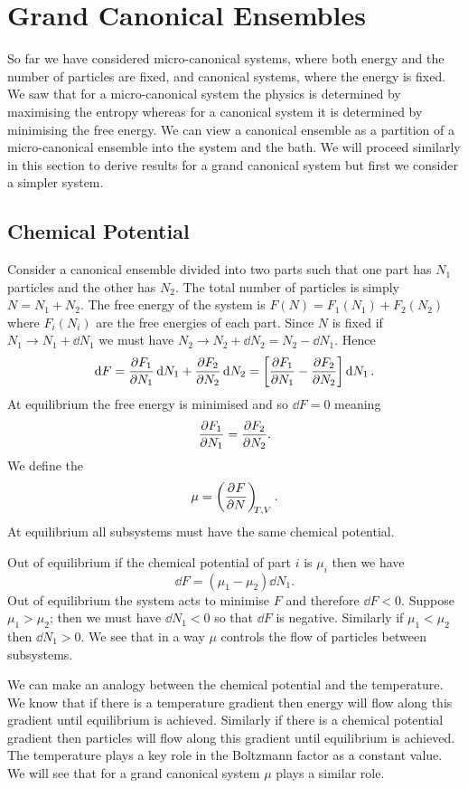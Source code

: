 \documentclass[a4paper]{article}
\begin{document}
    \section{Grand Canonical Ensembles}
    So far we have considered micro-canonical systems, where both energy and the number of particles are fixed, and canonical systems, where the energy is fixed.
    We saw that for a micro-canonical system the physics is determined by maximising the entropy whereas for a canonical system it is determined by minimising the free energy.
    We can view a canonical ensemble as a partition of a micro-canonical ensemble into the system and the bath.
    We will proceed similarly in this section to derive results for a grand canonical system but first we consider a simpler system.
    
    \subsection{Chemical Potential}
    Consider a canonical ensemble divided into two parts such that one part has \(N_1\) particles and the other has \(N_2\).
    The total number of particles is simply \(N = N_1 + N_2\).
    The free energy of the system is \(F(N) = F_1(N_1) + F_2(N_2)\) where \(F_i(N_i)\) are the free energies of each part.
    Since \(N\) is fixed if \(N_1 \to N_1 + \dd{N_1}\) we must have \(N_2 \to N_2 + \dd{N_2} = N_2 - \dd{N_1}\).
    Hence
    \[\dd{F} = \pdv{F_1}{N_1}\dd{N_1} + \pdv{F_2}{N_2}\dd{N_2} = \left[\pdv{F_1}{N_1} - \pdv{F_2}{N_2}\right] \dd{N_1}.\]
    At equilibrium the free energy is minimised and so \(\dd{F} = 0\) meaning
    \[\pdv{F_1}{N_1} = \pdv{F_2}{N_2}.\]
    We define the 
    \begin{equation}\label{eqn:definition of chemical potential}
        \mu = \left(\pdv[]{F}{N}\right)_{\!\!{T,V}}.
    \end{equation}
    At equilibrium all subsystems must have the same chemical potential.
    
    Out of equilibrium if the chemical potential of part \(i\) is \(\mu_i\) then we have
    \[\dd{F} = (\mu_1 - \mu_2)\dd{N_1}.\]
    Out of equilibrium the system acts to minimise \(F\) and therefore \(\dd{F} < 0\).
    Suppose \(\mu_1 > \mu_2\); then we must have \(\dd{N_1} < 0\) so that \(\dd{F}\) is negative.
    Similarly if \(\mu_1 < \mu_2\) then \(\dd{N_1} > 0\).
    We see that in a way \(\mu\) controls the flow of particles between subsystems.
    
    We can make an analogy between the chemical potential and the temperature.
    We know that if there is a temperature gradient then energy will flow along this gradient until equilibrium is achieved.
    Similarly if there is a chemical potential gradient then particles will flow along this gradient until equilibrium is achieved.
    The temperature plays a key role in the Boltzmann factor as a constant value.
    We will see that for a grand canonical system \(\mu\) plays a similar role.
    
\end{document}
